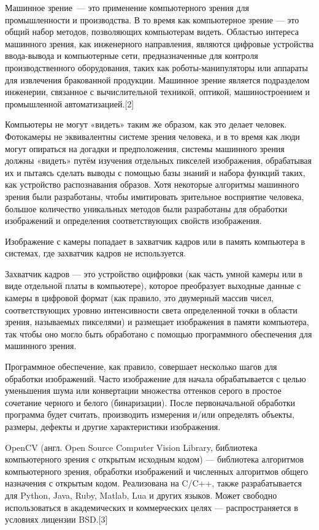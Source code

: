 Машинное зрение — это применение компьютерного зрения для промышленности и производства. В то время как компьютерное зрение — это общий набор методов, позволяющих компьютерам видеть. Областью интереса машинного зрения, как инженерного направления, являются цифровые устройства ввода-вывода и компьютерные сети, предназначенные для контроля производственного оборудования, таких как роботы-манипуляторы или аппараты для извлечения бракованной продукции. Машинное зрение является подразделом инженерии, связанное с вычислительной техникой, оптикой, машиностроением и промышленной автоматизацией.[2]

Компьютеры не могут «видеть» таким же образом, как это делает человек. Фотокамеры не эквивалентны системе зрения человека, и в то время как люди могут опираться на догадки и предположения, системы машинного зрения должны «видеть» путём изучения отдельных пикселей изображения, обрабатывая их и пытаясь сделать выводы с помощью базы знаний и набора функций таких, как устройство распознавания образов. Хотя некоторые алгоритмы машинного зрения были разработаны, чтобы имитировать зрительное восприятие человека, большое количество уникальных методов были разработаны для обработки изображений и определения соответствующих свойств изображения.

Изображение с камеры попадает в захватчик кадров или в память компьютера в системах, где захватчик кадров не используется. 

Захватчик кадров — это устройство оцифровки (как часть умной камеры или в виде отдельной платы в компьютере), которое преобразует выходные данные с камеры в цифровой формат (как правило, это двумерный массив чисел, соответствующих уровню интенсивности света определенной точки в области зрения, называемых пикселями) и размещает изображения в памяти компьютера, так чтобы оно могло быть обработано с помощью программного обеспечения для машинного зрения.

Программное обеспечение, как правило, совершает несколько шагов для обработки изображений. Часто изображение для начала обрабатывается с целью уменьшения шума или конвертации множества оттенков серого в простое сочетание черного и белого (бинаризации). После первоначальной обработки программа будет считать, производить измерения и/или определять объекты, размеры, дефекты и другие характеристики изображения.

OpenCV (англ. Open Source Computer Vision Library, библиотека компьютерного зрения с открытым исходным кодом) — библиотека алгоритмов компьютерного зрения, обработки изображений и численных алгоритмов общего назначения с открытым кодом. Реализована на C/C++, также разрабатывается для Python, Java, Ruby, Matlab, Lua и других языков. Может свободно использоваться в академических и коммерческих целях — распространяется в условиях лицензии BSD.[3]

